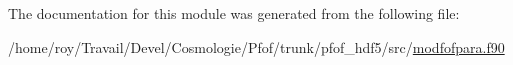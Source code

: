 The documentation for this module was generated from the following file\-:\begin{DoxyCompactItemize}
\item 
/home/roy/\-Travail/\-Devel/\-Cosmologie/\-Pfof/trunk/pfof\-\_\-hdf5/src/\hyperlink{pfof__hdf5_2src_2modfofpara_8f90}{modfofpara.\-f90}\end{DoxyCompactItemize}

